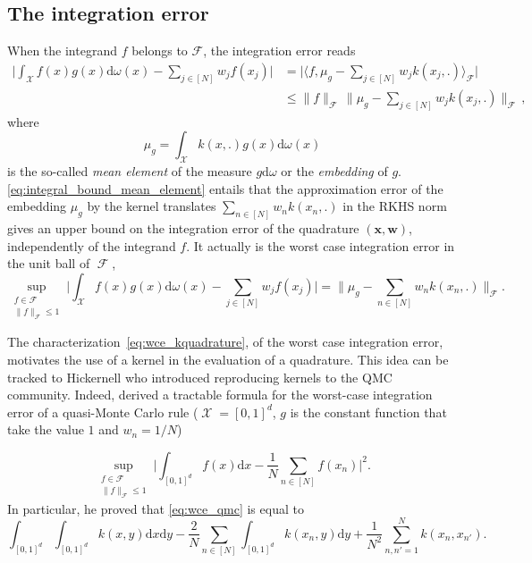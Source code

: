 \documentclass[twoside,11pt]{book}
\numberwithin{theorem}{chapter}
\numberwithin{definition}{chapter}
\numberwithin{proposition}{chapter}
\numberwithin{corollary}{chapter}
\numberwithin{example}{chapter}
\numberwithin{lemma}{chapter}
\numberwithin{assumption}{chapter}
\DeclareMathOperator{\F}{\mathcal{F}}
\DeclareMathOperator{\X}{\mathcal{X}}
\begin{document}
\subsection{The integration error}
\label{subsec:int_error}
When the integrand $f$ belongs to $\mathcal{F}$, the integration error reads \citep{SmGrSoSc07}
\begin{align}
\label{eq:integral_bound_mean_element}
  \bigg|\int_{\mathcal{X}} f(x)g(x)\mathrm{d}\omega(x) - \sum\limits_{j \in [N]} w_{j}f(x_{j}) \bigg|
  & = \bigg|\langle f, \mu_{g} - \sum\limits_{j \in [N]} w_{j} k(x_{j},.) \rangle_{\mathcal{F}} \bigg|\nonumber\\
  & \leq \|f\|_{\mathcal{F}} \, \Big\|\mu_{g} - \sum\limits_{j \in [N]} w_{j} k(x_{j},.)\Big\|_{\mathcal{F}}\,,
\end{align}
where
\begin{equation}
\mu_{g} = \int_{\mathcal{X}} k(x,.) g(x) \mathrm{d}\omega(x)
\end{equation}
 is the so-called \emph{mean element} \citep{DiPi14,MuFuSrSc17} of the measure $g \mathrm{d}\omega$ or the \emph{embedding} of $g$. \eqref{eq:integral_bound_mean_element} entails that the approximation error of the embedding $\mu_{g}$ by the kernel translates $\sum_{n \in [N]} w_{n}k(x_{n},.)$ in the RKHS norm gives an upper bound on the integration error of the quadrature $(\bm{x}, \bm{w})$, independently of the integrand $f$. It actually is the worst case integration error in the unit ball of $\F$,
\begin{equation}\label{eq:wce_kquadrature}
\sup\limits_{\substack{f \in \mathcal{F}\\ \|f\|_{\mathcal{F}} \leq 1}} \bigg|\int_{\mathcal{X}} f(x)g(x)\mathrm{d}\omega(x) - \sum\limits_{j \in [N]} w_{j}f(x_{j}) \bigg| = \|\mu_{g} - \sum\limits_{n \in [N]}w_{n} k(x_{n},.) \|_{\mathcal{F}}.
\end{equation}




The characterization~\eqref{eq:wce_kquadrature}, of the worst case integration error, motivates the use of a kernel in the evaluation of a quadrature. This idea can be tracked to Hickernell \citep{Hic96,Hic98} who introduced reproducing kernels to the QMC community. Indeed, \cite{Hic96} derived a tractable formula for the worst-case integration error of a quasi-Monte Carlo rule ($\X=[0,1]^{d}$, $g$ is the constant function that take the value $1$ and $w_{n}= 1/N$)

\begin{equation}\label{eq:wce_qmc}
 \sup\limits_{\substack{f \in \mathcal{F}\\ \|f\|_{\mathcal{F}} \leq 1}} \bigg|\int_{[0,1]^{d}} f(x)\mathrm{d}x - \frac{1}{N}\sum\limits_{n \in [N]} f(x_{n}) \bigg|^{2}.
\end{equation}
In particular, he proved that \eqref{eq:wce_qmc} is equal to 
\begin{equation}\label{eq:wce_qmc_2}
 \int_{[0,1]^{d}}\int_{[0,1]^{d}} k(x,y) \mathrm{d}x \mathrm{d}y - \frac{2}{N}\sum\limits_{n \in [N]} \int_{[0,1]^{d}} k(x_{n},y) \mathrm{d} y + \frac{1}{N^2}\sum\limits_{n,n'=1}^{N}k(x_{n},x_{n'}).
\end{equation}
\end{document}

